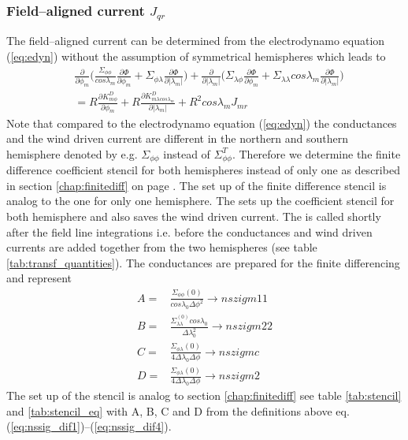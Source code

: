 \subsubsection{Field--aligned current $J_{qr}$}\label{chap:jqr}
% 
The field--aligned current can be determined from the electrodynamo
equation (\ref{eq:edyn}) without the assumption of symmetrical
hemispheres which leads to 
%
\begin{equation}
 \begin{split}
  & \frac{\partial}{\partial \phi_m} \bigl( \frac{\Sigma_{\phi \phi}}{cos
   \lambda_m} \frac{\partial \Phi}{\partial \phi_m} + 
   \Sigma_{\phi \lambda} \frac{\partial \Phi}{\partial |\lambda_m|} \bigr) +
   \frac{\partial}{\partial | \lambda_m |} \bigl( \Sigma_{\lambda \phi}
    \frac{\partial \Phi}{\partial \phi_m} + 
   \Sigma_{\lambda \lambda} cos \lambda_m 
   \frac{\partial \Phi}{\partial |\lambda_m|} \bigr) \\
  &  =
   R \frac{\partial K_{m \phi}^{D}}{\partial \phi_m} +  
   R \frac{\partial K_{m \lambda cos \lambda_m }^{D}}{\partial | \lambda_m |} +
   R^2 cos \lambda_m J_{mr}
    \label{eq:edyn_wosym}
  \end{split}
\end{equation}
%
Note that compared to the electrodynamo equation (\ref{eq:edyn}) the
conductances and the wind driven current are different in the northern and
southern hemisphere denoted by e.g. $\Sigma_{\phi \phi}$ instead of 
$\Sigma_{\phi \phi}^T$. Therefore we determine the finite difference coefficient 
stencil for both
hemispheres instead of only one as described in section \ref{chap:finitediff} on
page \pageref{page:diff_lhs}. The set up of the finite difference stencil  
is analog to the one for only one
hemisphere. The   sets up the
coefficient stencil for both hemisphere and also saves the wind driven current.
The   is called shortly after the field line
integrations i.e. before the conductances and wind driven currents are added
together from the two hemispheres (see table \ref{tab:transf_quantities}). 
The conductances are prepared for the finite differencing
and represent 
% 
\begin{align}
A=& \frac{\Sigma_{\phi \phi}(0)}{cos\lambda_0  \Delta \phi^2 }	   \rightarrow  nszigm11\label{eq:nssig_dif1}\\
B=& \frac{\Sigma_{\lambda \lambda}^(0) cos \lambda_0}{\Delta \lambda_0^2} \rightarrow  nszigm22\label{eq:nssig_dif2} \\
C=& \frac{\Sigma_{\phi \lambda}(0)}{4\Delta \lambda_0 \Delta \phi }    \rightarrow  nszigmc \label{eq:nssig_dif3} \\
D=& \frac{\Sigma_{\phi \lambda}(0)}{4 \Delta \lambda_0 \Delta \phi}    \rightarrow  nszigm2 \label{eq:nssig_dif4} 
\end{align}
%
The set up of the stencil is analog to section \ref{chap:finitediff}
see table \ref{tab:stencil} and \ref{tab:stencil_eq} with A, B, C and D
from the definitions above eq. (\ref{eq:nssig_dif1})--(\ref{eq:nssig_dif4}). \\

